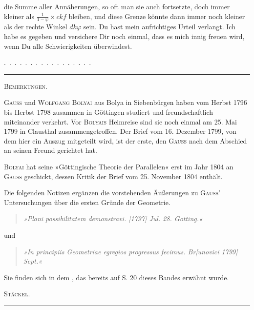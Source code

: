 die Summe aller Annäherungen, so oft man sie auch fortsetzte,
doch immer kleiner als $\frac{1}{1-\psi} \times ckf$ bleiben, und
diese Grenze könnte dann immer noch kleiner als der rechte Winkel
$dk\varphi$ sein. Du hast mein aufrichtiges Urteil verlangt. Ich
habe es gegeben und versichere Dir noch einmal, dass
es mich innig freuen wird, wenn Du alle Schwierigkeiten überwindest.

.\, .\, .\, .\, .\, .\, .\, .\, .\, .\, .\, .\, .\, .\, .\, .\, .

\medskip
\begin{center}
\rule{0.3\textwidth}{0.4pt}
\end{center}
\medskip

\begin{center}
\textsc{Bemerkungen.}
\end{center}

\textsc{Gauss} und \textsc{Wolfgang Bolyai} aus Bolya in
Siebenbürgen haben vom Herbst 1796 bis Herbst 1798 zusammen in
Göttingen studiert und freundschaftlich miteinander verkehrt. Vor
\textsc{Bolyais} Heimreise sind sie noch einmal am 25. Mai 1799 in
Clausthal zusammengetroffen. Der Brief vom 16. Dezember 1799, von
dem hier ein Auszug mitgeteilt wird, ist der erste, den \textsc{Gauss}
nach dem Abschied an seinen Freund gerichtet hat.

\textsc{Bolyai} hat seine »Göttingische Theorie der Parallelen« erst im Jahr 1804 an \textsc{Gauss} geschickt, dessen
Kritik der Brief vom 25. November 1804 enthält.

Die folgenden Notizen ergänzen die vorstehenden Äußerungen zu \textsc{Gauss}’
Untersuchungen über die ersten Gründe der
Geometrie.

\begin{quote}
\emph{»Plani possibilitatem demonstravi. [1797] Jul. 28. Gotting.«}
\end{quote}
und
\begin{quote}
\emph{»In principiis Geometriae egregios progressus fecimus.
Br[unovici 1799] Sept.«}
\end{quote}
Sie finden sich in dem , das bereits auf S. 20 dieses Bandes
erwähnt wurde.

\begin{flushright}
\textsc{Stäckel.}
\end{flushright}

\medskip
\begin{center}
\rule{0.3\textwidth}{0.4pt}
\end{center}
